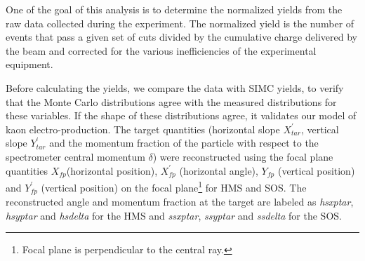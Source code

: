 %
%
%
\label{Comparison of Data with SIMC}
One of the goal of this analysis is to determine the normalized yields from the raw data collected during  the experiment. The normalized yield is the number of events that pass a given set of cuts divided by the cumulative charge delivered by the beam and corrected for the various inefficiencies of the experimental equipment. %
%
%
%
%
%
%
%

Before calculating the yields, we compare the data with SIMC yields, to verify that the Monte Carlo distributions agree with the measured distributions for these variables. If the shape of these distributions agree, it validates our model of kaon electro-production. The target quantities (horizontal slope $X_{tar}^\prime$, vertical slope $Y_{tar}^\prime$ and the momentum fraction of the particle with respect to the spectrometer central momentum $\delta$) were reconstructed using the focal plane quantities $X_{fp}$(horizontal position), $X_{fp}^\prime$ (horizontal angle), $Y_{fp}$ (vertical position) and $Y_{fp}^\prime$ (vertical position) on the focal plane\footnote{Focal plane is perpendicular to the central ray.} for HMS and SOS. The reconstructed angle and momentum fraction at the target are labeled as \textit{hsxptar}, \textit{hsyptar} and \textit{hsdelta} for the HMS and \textit{ssxptar}, \textit{ssyptar} and \textit{ssdelta} for the SOS.

